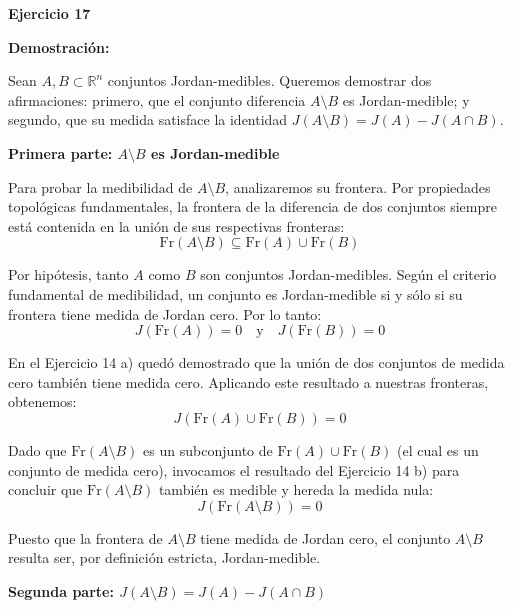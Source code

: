 \documentclass[11pt,letterpaper]{article}
\begin{document}
\textbf{Ejercicio 17}

\textbf{Demostración:}

Sean $A, B \subset \mathbb{R}^n$ conjuntos Jordan-medibles. Queremos demostrar dos afirmaciones: primero, que el conjunto diferencia $A \setminus B$ es Jordan-medible; y segundo, que su medida satisface la identidad $J(A \setminus B) = J(A) - J(A \cap B)$.

\vspace{0.5cm}
\textbf{Primera parte: $A \setminus B$ es Jordan-medible}

Para probar la medibilidad de $A \setminus B$, analizaremos su frontera. Por propiedades topológicas fundamentales, la frontera de la diferencia de dos conjuntos siempre está contenida en la unión de sus respectivas fronteras:
\begin{equation*}
\text{Fr}(A \setminus B) \subseteq \text{Fr}(A) \cup \text{Fr}(B)
\end{equation*}

Por hipótesis, tanto $A$ como $B$ son conjuntos Jordan-medibles. Según el criterio fundamental de medibilidad, un conjunto es Jordan-medible si y sólo si su frontera tiene medida de Jordan cero. Por lo tanto:
\begin{equation*}
J(\text{Fr}(A)) = 0 \quad \text{y} \quad J(\text{Fr}(B)) = 0
\end{equation*}

En el Ejercicio 14 a) quedó demostrado que la unión de dos conjuntos de medida cero también tiene medida cero. Aplicando este resultado a nuestras fronteras, obtenemos:
\begin{equation*}
J(\text{Fr}(A) \cup \text{Fr}(B)) = 0
\end{equation*}

Dado que $\text{Fr}(A \setminus B)$ es un subconjunto de $\text{Fr}(A) \cup \text{Fr}(B)$ (el cual es un conjunto de medida cero), invocamos el resultado del Ejercicio 14 b) para concluir que $\text{Fr}(A \setminus B)$ también es medible y hereda la medida nula:
\begin{equation*}
J(\text{Fr}(A \setminus B)) = 0
\end{equation*}

Puesto que la frontera de $A \setminus B$ tiene medida de Jordan cero, el conjunto $A \setminus B$ resulta ser, por definición estricta, Jordan-medible.

\vspace{0.5cm}
\textbf{Segunda parte: $J(A \setminus B) = J(A) - J(A \cap B)$}
\end{document}
